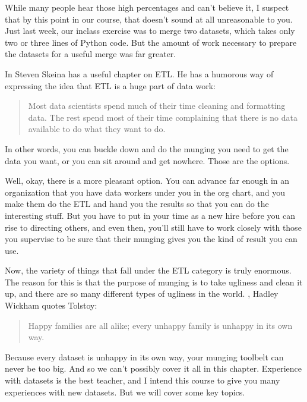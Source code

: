\documentclass[letterpaper,10pt,english]{jupyterBook}
\begin{document}
\sphinxAtStartPar
While many people hear those high percentages and can’t believe it, I suspect that by this point in our course, that doesn’t sound at all unreasonable to you.  Just last week, our in\sphinxhyphen{}class exercise was to merge two datasets, which takes only two or three lines of Python code.  But the amount of work necessary to prepare the datasets for a useful merge was far greater.

\sphinxAtStartPar
In  Steven Skeina has a useful chapter on ETL.  He has a humorous way of expressing the idea that ETL is a huge part of data work:
\begin{quote}

\sphinxAtStartPar
Most data scientists spend much of their time cleaning and formatting data. The rest spend most of their time complaining that there is no data available to do what they want to do.
\end{quote}

\sphinxAtStartPar
In other words, you can buckle down and do the munging you need to get the data you want, or you can sit around and get nowhere.  Those are the options.

\sphinxAtStartPar
Well, okay, there is a more pleasant option.  You can advance far enough in an organization that you have data workers under you in the org chart, and you make them do the ETL and hand you the results so that you can do the interesting stuff.  But you have to put in your time as a new hire before you can rise to directing others, and even then, you’ll still have to work closely with those you supervise to be sure that their munging gives you the kind of result you can use.

\sphinxAtStartPar
Now, the variety of things that fall under the ETL category is truly enormous.  The reason for this is that the purpose of munging is to take ugliness and clean it up, and there are so many different types of ugliness in the world.  , Hadley Wickham quotes Tolstoy:
\begin{quote}

\sphinxAtStartPar
Happy families are all alike; every unhappy family is unhappy in its own way.
\end{quote}

\sphinxAtStartPar
Because every dataset is unhappy in its own way, your munging toolbelt can never be too big.  And so we can’t possibly cover it all in this chapter.  Experience with datasets is the best teacher, and I intend this course to give you many experiences with new datasets.  But we will cover some key topics.
\end{document}
